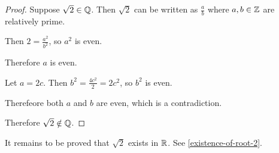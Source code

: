 \begin{proof}
  Suppose $\sqrt{2} \in \mathbb{Q}$. Then $\sqrt{2}$ can be written as $\frac{a}{b}$ where $a, b \in \mathbb{Z}$ are relatively prime.

  Then $2 = \frac{a^2}{b^2}$, so $a^2$ is even.

  Therefore $a$ is even.

  Let $a = 2c$. Then $b^2 = \frac{4c^2}{2} = 2c^2$, so $b^2$ is even.

  Therefeore both $a$ and $b$ are even, which is a contradiction.

  Therefore $\sqrt{2} \notin \mathbb{Q}$.
\end{proof}

\begin{remark*}
  It remains to be proved that $\sqrt{2}$ exists in $\mathbb{R}$. See \ref{existence-of-root-2}.
\end{remark*}

